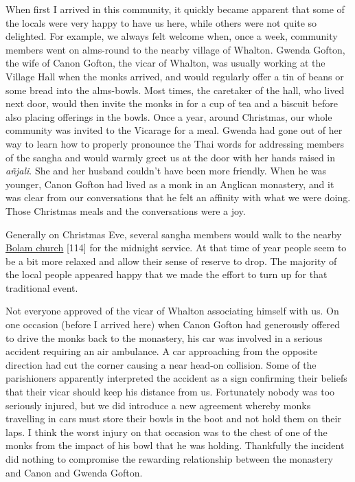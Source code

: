 When first I arrived in this community, it quickly became apparent that
some of the locals were very happy to have us here, while others were
not quite so delighted. For example, we always felt welcome when, once a
week, community members went on alms-round to the nearby village of
Whalton. Gwenda Gofton, the wife of Canon Gofton, the vicar of Whalton,
was usually working at the Village Hall when the monks arrived, and
would regularly offer a tin of beans or some bread into the alms-bowls.
Most times, the caretaker of the hall, who lived next door, would then
invite the monks in for a cup of tea and a biscuit before also placing
offerings in the bowls. Once a year, around Christmas, our whole
community was invited to the Vicarage for a meal. Gwenda had gone out of
her way to learn how to properly pronounce the Thai words for addressing
members of the sangha and would warmly greet us at the door with her
hands raised in \emph{añjali}. She and her husband couldn't have been
more friendly. When he was younger, Canon Gofton had lived as a monk in
an Anglican monastery, and it was clear from our conversations that he
felt an affinity with what we were doing. Those Christmas meals and the
conversations were a joy.

Generally on Christmas Eve, several sangha members would walk to the
nearby
\href{http://www.standrewsbolam.btck.co.uk/StAndrewsChurch}{\underline{Bolam
church}} {[}114{]} for the midnight service. At that time of year people
seem to be a bit more relaxed and allow their sense of reserve to drop.
The majority of the local people appeared happy that we made the effort
to turn up for that traditional event.

Not everyone approved of the vicar of Whalton associating himself with
us. On one occasion (before I arrived here) when Canon Gofton had
generously offered to drive the monks back to the monastery, his car was
involved in a serious accident requiring an air ambulance. A car
approaching from the opposite direction had cut the corner causing a
near head-on collision. Some of the parishioners apparently interpreted
the accident as a sign confirming their beliefs that their vicar should
keep his distance from us. Fortunately nobody was too seriously injured,
but we did introduce a new agreement whereby monks travelling in cars
must store their bowls in the boot and not hold them on their laps. I
think the worst injury on that occasion was to the chest of one of the
monks from the impact of his bowl that he was holding. Thankfully the
incident did nothing to compromise the rewarding relationship between
the monastery and Canon and Gwenda Gofton.

